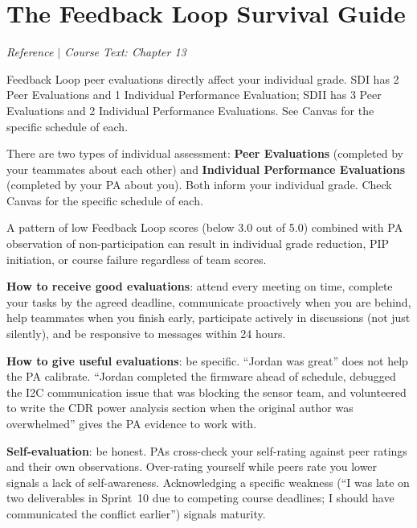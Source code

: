 \section{The Feedback Loop Survival Guide}
\textit{Reference $|$ Course Text: Chapter 13}

Feedback Loop peer evaluations directly affect your individual grade. SDI has 2 Peer Evaluations and 1 Individual Performance Evaluation; SDII has 3 Peer Evaluations and 2 Individual Performance Evaluations. See Canvas for the specific schedule of each.

\begin{protip}
There are two types of individual assessment: \textbf{Peer Evaluations} (completed by your teammates about each other) and \textbf{Individual Performance Evaluations} (completed by your PA about you). Both inform your individual grade. Check Canvas for the specific schedule of each.
\end{protip}

\begin{warnbox}
A pattern of low Feedback Loop scores (below 3.0 out of 5.0) combined with PA observation of non-participation can result in individual grade reduction, PIP initiation, or course failure regardless of team scores.
\end{warnbox}

\textbf{How to receive good evaluations}: attend every meeting on time, complete your tasks by the agreed deadline, communicate proactively when you are behind, help teammates when you finish early, participate actively in discussions (not just silently), and be responsive to messages within 24 hours.

\textbf{How to give useful evaluations}: be specific. ``Jordan was great'' does not help the PA calibrate. ``Jordan completed the firmware ahead of schedule, debugged the I2C communication issue that was blocking the sensor team, and volunteered to write the CDR power analysis section when the original author was overwhelmed'' gives the PA evidence to work with.

\textbf{Self-evaluation}: be honest. PAs cross-check your self-rating against peer ratings and their own observations. Over-rating yourself while peers rate you lower signals a lack of self-awareness. Acknowledging a specific weakness (``I was late on two deliverables in Sprint~10 due to competing course deadlines; I should have communicated the conflict earlier'') signals maturity.


